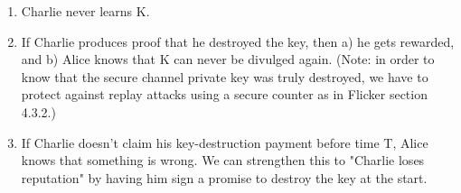 \documentclass{article}
\begin{document}
\begin{enumerate}

\item Charlie never learns K.

\item If Charlie produces proof that he destroyed the key, then a) he gets rewarded, and b) Alice knows that K can never be divulged again. (Note: in order to know that the secure channel private key was truly destroyed, we have to protect against replay attacks using a secure counter as in Flicker section 4.3.2.)

\item If Charlie doesn't claim his key-destruction payment before time T, Alice knows that something is wrong. We can strengthen this to "Charlie loses reputation" by having him sign a promise to destroy the key at the start.

\end{enumerate}
\end{document}
